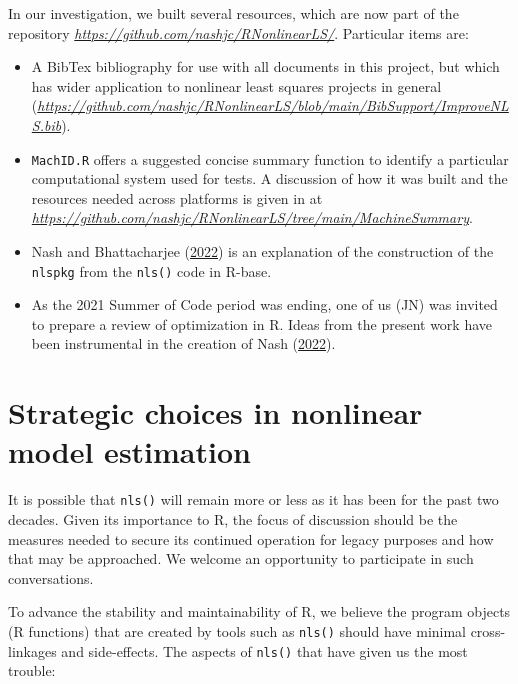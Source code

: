 \documentclass[
]{article}
\begin{document}
In our investigation, we built several resources, which are now part of
the repository \emph{\url{https://github.com/nashjc/RNonlinearLS/}}.
Particular items are:

\begin{itemize}
\item
  A BibTex bibliography for use with all documents in this project, but
  which has wider application to nonlinear least squares projects in
  general
  (\emph{\url{https://github.com/nashjc/RNonlinearLS/blob/main/BibSupport/ImproveNLS.bib}}).
\item
  \texttt{MachID.R} offers a suggested concise summary function to
  identify a particular computational system used for tests. A
  discussion of how it was built and the resources needed across
  platforms is given in at
  \emph{\url{https://github.com/nashjc/RNonlinearLS/tree/main/MachineSummary}}.
\item
  Nash and Bhattacharjee (\protect\hyperlink{ref-PkgFromRbase22}{2022})
  is an explanation of the construction of the \texttt{nlspkg} from the
  \texttt{nls()} code in R-base.
\item
  As the 2021 Summer of Code period was ending, one of us (JN) was
  invited to prepare a review of optimization in R. Ideas from the
  present work have been instrumental in the creation of Nash
  (\protect\hyperlink{ref-NashWires22}{2022}).
\end{itemize}

\hypertarget{strategic-choices-in-nonlinear-model-estimation}{%
\section{Strategic choices in nonlinear model
estimation}\label{strategic-choices-in-nonlinear-model-estimation}}

It is possible that \texttt{nls()} will remain more or less as it has
been for the past two decades. Given its importance to R, the focus of
discussion should be the measures needed to secure its continued
operation for legacy purposes and how that may be approached. We welcome
an opportunity to participate in such conversations.

To advance the stability and maintainability of R, we believe the
program objects (R functions) that are created by tools such as
\texttt{nls()} should have minimal cross-linkages and side-effects. The
aspects of \texttt{nls()} that have given us the most trouble:
\end{document}
